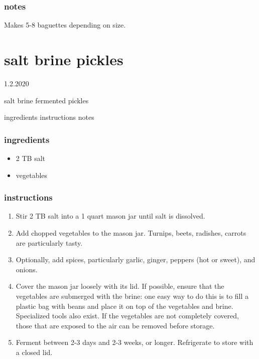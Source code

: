 \documentclass[]{book}
\providecommand{\tightlist}{%
  \setlength{\itemsep}{0pt}\setlength{\parskip}{0pt}}
\begin{document}
\hypertarget{notes-14}{%
\subsection{notes}\label{notes-14}}

Makes 5-8 baguettes depending on size.

\hypertarget{salt-brine-pickles}{%
\chapter{salt brine pickles}\label{salt-brine-pickles}}

1.2.2020

salt brine fermented pickles

ingredients \textbar{}
instructions \textbar{}
notes

\hypertarget{ingredients-15}{%
\subsection{ingredients}\label{ingredients-15}}

\begin{itemize}
\tightlist
\item
  2 TB salt
\item
  vegetables
\end{itemize}

\hypertarget{instructions-15}{%
\subsection{instructions}\label{instructions-15}}

\begin{enumerate}
\def\labelenumi{\arabic{enumi}.}
\tightlist
\item
  Stir 2 TB salt into a 1 quart mason jar until salt is dissolved.
\item
  Add chopped vegetables to the mason jar. Turnips, beets, radishes, carrots are particularly tasty.
\item
  Optionally, add spices, particularly garlic, ginger, peppers (hot or sweet), and onions.
\item
  Cover the mason jar loosely with its lid. If possible, ensure that the vegetables are submerged with the brine: one easy way to do this is to fill a plastic bag with beans and place it on top of the vegetables and brine. Specialized tools also exist. If the vegetables are not completely covered, those that are exposed to the air can be removed before storage.
\item
  Ferment between 2-3 days and 2-3 weeks, or longer. Refrigerate to store with a closed lid.
\end{enumerate}
\end{document}
